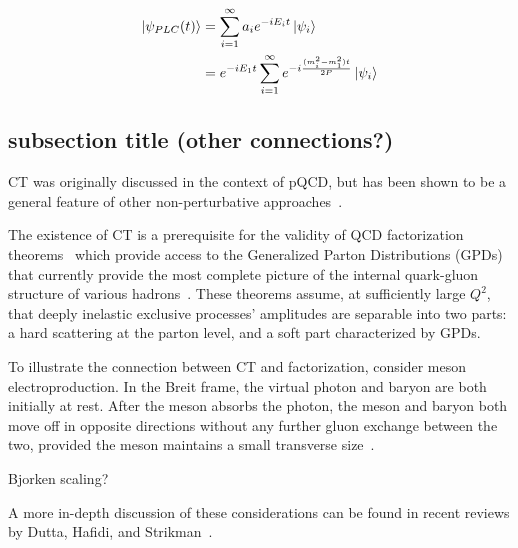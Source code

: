 \begin{align}
    \ket{\psi_{PLC}(t)} &= \sum_{i=1}^{\infty} a_i e^{-iE_it}\ket{\psi_i} \\
                        &= e^{-iE_1t} \sum_{i=1}^{\infty} e^{-i\frac{(m_i^2-m_1^2)t}{2P}} \ket{\psi_i}
\end{align}


\subsection{subsection title (other connections?)}
CT was originally discussed in the context of pQCD, but has been shown to be
a general feature of other non-perturbative approaches~\cite{Frankfurt_1992}.


The existence of CT is a prerequisite for the validity of QCD factorization
theorems~\cite{Brodsky_1994, Collins_1997, Frankfurt_1999, Diehl_1998,
Strikman_2000} which provide access to the Generalized Parton Distributions
(GPDs) that currently provide the most complete picture of the internal
quark-gluon structure of various hadrons~\cite{Ji_1997_Jan, Ji_1997_Jun,
Radyushkin_1996, Radyushkin_1997}.
These theorems assume, at sufficiently large $Q^2$, that deeply inelastic
exclusive processes' amplitudes are separable into two parts: a hard scattering
at the parton level, and a soft part characterized by GPDs.




To illustrate the connection between CT and factorization, consider
meson electroproduction.
In the Breit frame, the virtual photon and baryon are both initially at rest.
After the meson absorbs the photon, the meson and baryon both move off in
opposite directions without any further gluon exchange between the two,
provided the meson maintains a small transverse size~\cite{Strikman_2000}.



Bjorken scaling?


A more in-depth discussion of these considerations can be found in recent
reviews by Dutta, Hafidi, and Strikman~\cite{Dutta_2013,Dutta_2012}.
